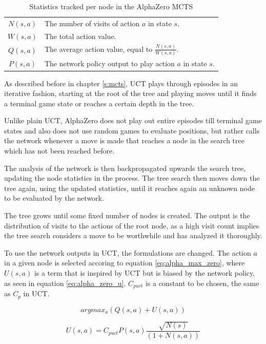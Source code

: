 \documentclass[12pt,onecolumn,oneside,titlepage]{article}
\begin{document}
\begin{table} [H]
 \centering
  \begin{tabular}{ c l }
  $N(s,a)$ & The number of visits of action $a$ in state $s$. \\ 
  $W(s,a)$ & The total action value. \\  
  $Q(s, a)$ & The average action value, equal to $\frac{N(s,a)}{W(s,a)}$. \\
  $P(s,a)$ & The network policy output to play action $a$ in state $s$.
  \end{tabular}
  \caption{Statistics tracked per node in the AlphaZero MCTS}
  \label{t:mcts_stats_values}
\end{table}

As described before in chapter \ref{s:mcts}, UCT plays through episodes in an iterative fashion, starting at the root of the tree and playing moves until it finds a terminal game state or reaches a certain depth in the tree.

Unlike plain UCT, AlphaZero does not play out entire episodes till terminal game states and also does not use random games to evaluate positions, but rather calls the network whenever a move is made that reaches a node in the search tree which has not been reached before.

The analysis of the network is then backpropagated upwards the search tree, updating the node statistics in the process. The tree search then moves down the tree again, using the updated statistics, until it reaches again an unknown node to be evaluated by the network.

The tree grows until some fixed number of nodes is created. The output is the distribution of visits to the actions of the root node, as a high visit count implies the tree search considers a move to be worthwhile and has analyzed it thoroughly.

To use the network outputs in UCT, the formulations are changed. The action $a$ in a given node is selected accoring to equation \ref{eq:alpha_max_zero}, where $U(s,a)$ is a term that is inspired by UCT but is biased by the network policy, as seen in equation \ref{eq:alpha_zero_u}.
$C_{puct}$ is a constant to be chosen, the same as $C_p$ in UCT.

\begin{equation}
 argmax_a(Q(s, a) + U(s, a))\label{eq:alpha_max_zero}
\end{equation}

\begin{equation}
 U(s,a) = C_{puct} P(s,a) \frac{\sqrt{N(s)}}{(1+N(s,a))}\label{eq:alpha_zero_u}
\end{equation}
\end{document}
